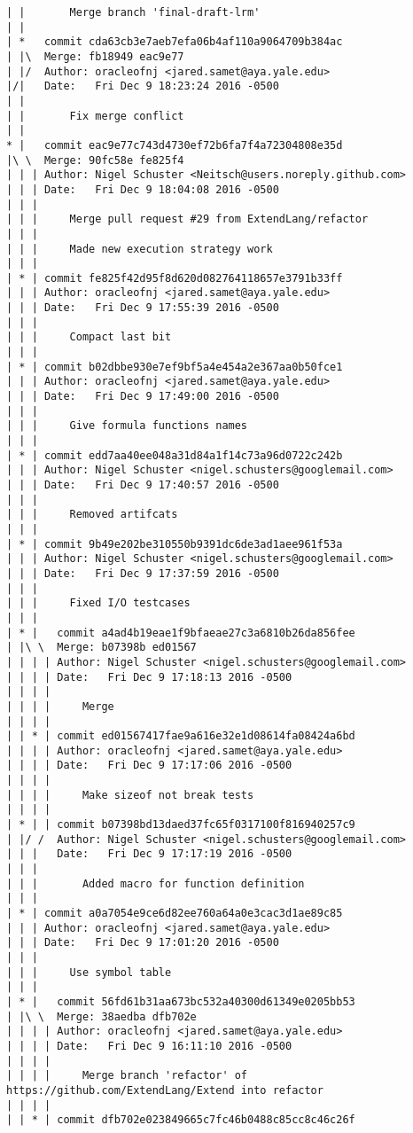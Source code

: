 \begin{lstlisting}
| |       Merge branch 'final-draft-lrm'
| |     
| *   commit cda63cb3e7aeb7efa06b4af110a9064709b384ac
| |\  Merge: fb18949 eac9e77
| |/  Author: oracleofnj <jared.samet@aya.yale.edu>
|/|   Date:   Fri Dec 9 18:23:24 2016 -0500
| |   
| |       Fix merge conflict
| |     
* |   commit eac9e77c743d4730ef72b6fa7f4a72304808e35d
|\ \  Merge: 90fc58e fe825f4
| | | Author: Nigel Schuster <Neitsch@users.noreply.github.com>
| | | Date:   Fri Dec 9 18:04:08 2016 -0500
| | | 
| | |     Merge pull request #29 from ExtendLang/refactor
| | |     
| | |     Made new execution strategy work
| | |    
| * | commit fe825f42d95f8d620d082764118657e3791b33ff
| | | Author: oracleofnj <jared.samet@aya.yale.edu>
| | | Date:   Fri Dec 9 17:55:39 2016 -0500
| | | 
| | |     Compact last bit
| | |    
| * | commit b02dbbe930e7ef9bf5a4e454a2e367aa0b50fce1
| | | Author: oracleofnj <jared.samet@aya.yale.edu>
| | | Date:   Fri Dec 9 17:49:00 2016 -0500
| | | 
| | |     Give formula functions names
| | |    
| * | commit edd7aa40ee048a31d84a1f14c73a96d0722c242b
| | | Author: Nigel Schuster <nigel.schusters@googlemail.com>
| | | Date:   Fri Dec 9 17:40:57 2016 -0500
| | | 
| | |     Removed artifcats
| | |    
| * | commit 9b49e202be310550b9391dc6de3ad1aee961f53a
| | | Author: Nigel Schuster <nigel.schusters@googlemail.com>
| | | Date:   Fri Dec 9 17:37:59 2016 -0500
| | | 
| | |     Fixed I/O testcases
| | |      
| * |   commit a4ad4b19eae1f9bfaeae27c3a6810b26da856fee
| |\ \  Merge: b07398b ed01567
| | | | Author: Nigel Schuster <nigel.schusters@googlemail.com>
| | | | Date:   Fri Dec 9 17:18:13 2016 -0500
| | | | 
| | | |     Merge
| | | |     
| | * | commit ed01567417fae9a616e32e1d08614fa08424a6bd
| | | | Author: oracleofnj <jared.samet@aya.yale.edu>
| | | | Date:   Fri Dec 9 17:17:06 2016 -0500
| | | | 
| | | |     Make sizeof not break tests
| | | |     
| * | | commit b07398bd13daed37fc65f0317100f816940257c9
| |/ /  Author: Nigel Schuster <nigel.schusters@googlemail.com>
| | |   Date:   Fri Dec 9 17:17:19 2016 -0500
| | |   
| | |       Added macro for function definition
| | |    
| * | commit a0a7054e9ce6d82ee760a64a0e3cac3d1ae89c85
| | | Author: oracleofnj <jared.samet@aya.yale.edu>
| | | Date:   Fri Dec 9 17:01:20 2016 -0500
| | | 
| | |     Use symbol table
| | |      
| * |   commit 56fd61b31aa673bc532a40300d61349e0205bb53
| |\ \  Merge: 38aedba dfb702e
| | | | Author: oracleofnj <jared.samet@aya.yale.edu>
| | | | Date:   Fri Dec 9 16:11:10 2016 -0500
| | | | 
| | | |     Merge branch 'refactor' of https://github.com/ExtendLang/Extend into refactor
| | | |     
| | * | commit dfb702e023849665c7fc46b0488c85cc8c46c26f

\end{lstlisting}
